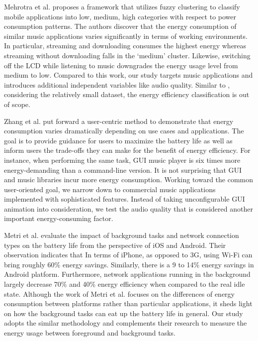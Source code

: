 Mehrotra et al. \cite{mehrotra2018analyse} proposes a framework that utilizes fuzzy clustering to classify mobile applications into low, medium, high categories with respect to power consumption patterns. The authors discover that the energy consumption of similar music applications varies significantly in terms of working environments. In particular, streaming and downloading consumes the highest energy whereas streaming without downloading falls in the ‘medium’ cluster. Likewise, switching off the LCD while listening to music downgrades the energy usage level from medium to low. Compared to this work, our study targets music applications and introduces additional independent variables like audio quality. Similar to \cite{baek2018energy}, considering the relatively small dataset, the energy efficiency classification is out of scope. 

Zhang et al. \cite{zhang2014impact} put forward a user-centric method to demonstrate that energy consumption varies dramatically depending on use cases and applications. The goal is to provide guidance for users to maximize the battery life as well as inform users the trade-offs they can make for the benefit of energy efficiency. For instance, when performing the same task, GUI music player is six times more energy-demanding than a command-line version. It is not surprising that GUI and music libraries incur more energy consumption. Working toward the common user-oriented goal, we narrow down to commercial music applications implemented with sophisticated features. Instead of taking unconfigurable GUI animation into consideration, we test the audio quality that is considered another important energy-consuming factor. 

Metri et al. \cite{metri2012eating}  evaluate the impact of background tasks and network connection types on the battery life from the perspective of iOS and Android. Their observation indicates that In terms of iPhone, as opposed to 3G, using Wi-Fi can bring roughly 60\% energy savings. Similarly, there is a 9 to 14\% energy savings in Android platform. Furthermore, network applications running in the background largely decrease 70\% and 40\% energy efficiency when compared to the real idle state. Although the work of Metri et al. focuses on the differences of energy consumption between platforms rather than particular applications, it sheds light on how the background tasks can eat up the battery life in general. Our study adopts the similar methodology and complements their research to measure the energy usage between foreground and background tasks. 

